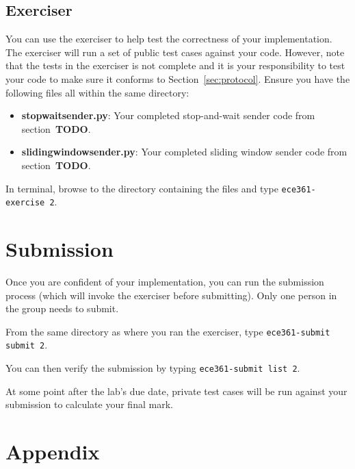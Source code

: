 \documentclass[11pt]{article}
\def\thelab{2}
\begin{document}
\subsection{Exerciser}
\label{sec:exercise}
You can use the exerciser to help test the correctness of your implementation. The exerciser will run a set of public test cases against your code. However, note that the tests in the exerciser is not complete and it is your responsibility to test your code to make sure it conforms to Section~\ref{sec:protocol}.
Ensure you have the following files all within the same directory:
\begin{itemize}
    \item \textbf{stopwaitsender.py}: Your completed stop-and-wait sender code from section~\textbf{TODO}.
    \item \textbf{slidingwindowsender.py}: Your completed sliding window sender code from section~\textbf{TODO}.
\end{itemize}

In terminal, browse to the directory containing the files and type \texttt{ece361-exercise \thelab}.


\section{Submission}
\label{sec:submission}
Once you are confident of your implementation, you can run the submission process (which will invoke the exerciser before submitting).
Only one person in the group needs to submit.

From the same directory as where you ran the exerciser, type \texttt{ece361-submit submit \thelab}.

You can then verify the submission by typing \texttt{ece361-submit list \thelab}.

At some point after the lab's due date, private test cases will be run against your submission to calculate your final mark.

\newpage
\appendix
\section{Appendix}
\label{sec:appendix}
\end{document}
